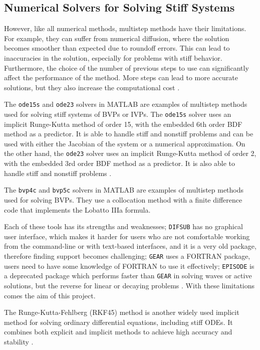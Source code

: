 \documentclass[a4paper, twoside]{report} %
\begin{document}
	\subsection*{Numerical Solvers for Solving Stiff Systems}

	However, like all numerical methods, multistep methods have their limitations. For example, they can suffer from numerical diffusion, where the solution becomes smoother than expected due to roundoff errors. This can lead to inaccuracies in the solution, especially for problems with stiff behavior. Furthermore, the choice of the number of previous steps to use can significantly affect the performance of the method. More steps can lead to more accurate solutions, but they also increase the computational cost \cite{math7121158}.

	The \texttt{ode15s} and \texttt{ode23} solvers in MATLAB are examples of multistep methods used for solving stiff systems of BVPs or IVPs. The \texttt{ode15s} solver uses an implicit Runge-Kutta method of order 15, with the embedded 6th order BDF method as a predictor. It is able to handle stiff and nonstiff problems and can be used with either the Jacobian of the system or a numerical approximation. On the other hand, the \texttt{ode23} solver uses an implicit Runge-Kutta method of order 2, with the embedded 3rd order BDF method as a predictor. It is also able to handle stiff and nonstiff problems \cite{wong2020lecture}.

	The \texttt{bvp4c} and \texttt{bvp5c} solvers in MATLAB are examples of multistep methods used for solving BVPs. They use a collocation method with a finite difference code that implements the Lobatto IIIa formula.

	Each of these tools has its strengths and weaknesses; \texttt{DIFSUB} has no graphical user interface, which makes it harder for users who are not comfortable working from the command-line or with text-based interfaces, and it is a very old package, therefore finding support becomes challenging; \texttt{GEAR} uses a FORTRAN package, users need to have some knowledge of FORTRAN to use it effectively; \texttt{EPISODE} is a deprecated package which performs faster than \texttt{GEAR} in solving waves or active solutions, but the reverse for linear or decaying problems \cite{BYRNE1977125}. With these limitations comes the aim of this project.

	The Runge-Kutta-Fehlberg (RKF45) method is another widely used implicit method for solving ordinary differential equations, including stiff ODEs. It combines both explicit and implicit methods to achieve high accuracy and stability \cite{stone2017accelerating}.
\end{document}
